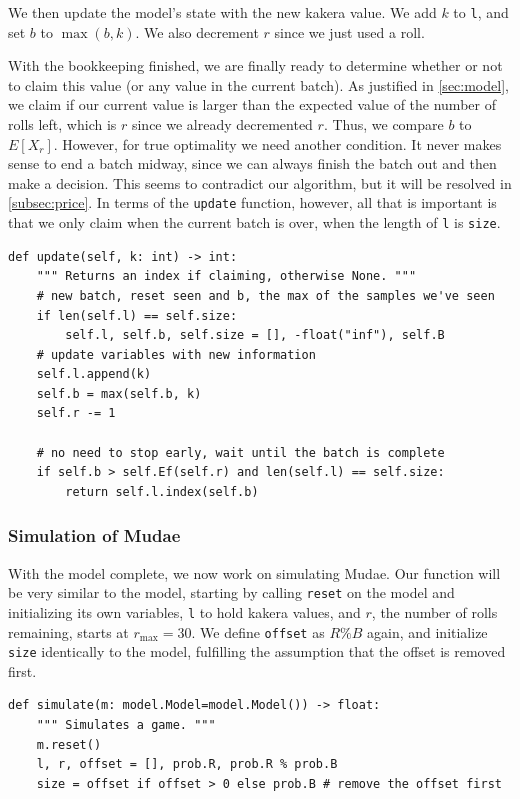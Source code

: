 \documentclass[11pt, oneside]{article}
\theoremstyle{plain}
\theoremstyle{definition}
\begin{document}
We then update the model's state with the new kakera value. We add \( k \) to
\texttt{l}, and set \( b \) to \( \max(b, k) \). We also decrement \( r \)
since we just used a roll.

With the bookkeeping finished, we are finally ready to determine whether or
not to claim this value (or any value in the current batch). As justified
in \autoref{sec:model}, we claim if our current value is larger than the
expected value of the number of rolls left, which is \( r \) since we
already decremented \( r \). Thus, we compare \( b \) to \( E[X_r] \).
However, for true optimality we need another condition. It never makes
sense to end a batch midway, since we can always finish the batch out and
then make a decision. This seems to contradict our algorithm, but it will
be resolved in \autoref{subsec:price}. In terms of the \texttt{update}
function, however, all that is important is that we only claim when the
current batch is over, when the length of \texttt{l} is \texttt{size}.

\begin{verbatim}
def update(self, k: int) -> int:
    """ Returns an index if claiming, otherwise None. """
    # new batch, reset seen and b, the max of the samples we've seen
    if len(self.l) == self.size:
        self.l, self.b, self.size = [], -float("inf"), self.B
    # update variables with new information
    self.l.append(k)
    self.b = max(self.b, k)
    self.r -= 1

    # no need to stop early, wait until the batch is complete 
    if self.b > self.Ef(self.r) and len(self.l) == self.size:
        return self.l.index(self.b)
\end{verbatim}

\subsubsection{Simulation of Mudae}
With the model complete, we now work on simulating Mudae. Our function will be
very similar to the model, starting by calling \texttt{reset} on the model and
initializing its own variables, \texttt{l} to hold kakera values, and \( r \),
the number of rolls remaining, starts at \( r_{\text{max}} = 30 \). We define
\texttt{offset} as \( R \% B \) again, and initialize \texttt{size} identically
to the model, fulfilling the assumption that the offset is removed first.
\begin{verbatim}
def simulate(m: model.Model=model.Model()) -> float:
    """ Simulates a game. """
    m.reset()
    l, r, offset = [], prob.R, prob.R % prob.B
    size = offset if offset > 0 else prob.B # remove the offset first
\end{verbatim}
\end{document}
